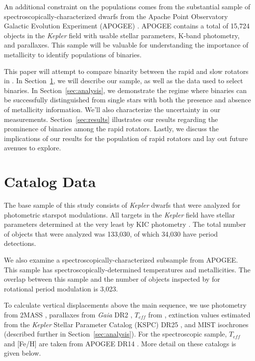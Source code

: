 \documentclass[manuscript]{aastex6}
\newcommand{\Kepler}{\mbox{\textit{Kepler}}}
\newcommand{\Gaia}{\mbox{\textit{Gaia}}}
\newcommand{\Teff}{\ensuremath{T_{eff}}}
\begin{document}
An additional constraint on the populations comes from the substantial sample
of spectroscopically-characterized dwarfs from the Apache Point Observatory
Galactic Evolution Experiment (APOGEE) \citep{Majewski17}. APOGEE contains a 
total of 15,724 objects in the \Kepler{} field with usable stellar parameters,
K-band photometry, and parallaxes.  This sample will be valuable for 
understanding the importance of metallicity to identify populations of 
binaries.

This paper will attempt to compare binarity between the rapid and slow rotators 
in \citet{McQuillan14}. In Section~\ref{sec:data}, we will describe our 
sample, as well as the data used to select binaries. In Section~\ref{sec:analysis}, we demonstrate the regime where 
binaries can be successfully distinguished from single stars with both the 
presence and absence of metallicity information. We'll also characterize the 
uncertainty in our measurements. Section~\ref{sec:results} illustrates our 
results regarding the prominence of binaries among the rapid rotators. Lastly, 
we discuss the implications of our results for the population of rapid rotators 
and lay out future avenues to explore.

\section{Catalog Data}
\label{sec:data}

The base sample of this study consists of \Kepler{} dwarfs that were analyzed
for photometric starspot modulations. All targets in the \Kepler{} field have 
stellar parameters determined at the very least by KIC photometry 
\citep{Brown11}. The total number of objects that were analyzed was 133,030, 
of which 34,030 have period detections.

We also examine a spectroscopically-characterized subsample from APOGEE\@. 
This sample has spectroscopically-determined temperatures and metallicities. 
The overlap between this sample and the number of objects inspected by 
\citet{McQuillan14} for rotational period modulation is 3,023.

To calculate vertical displacements above the main sequence, we use photometry
from 2MASS \citep{Skrutskie06}, parallaxes from \Gaia{} DR2 \citep{Gaia18},
\Teff{} from \citet{Pinsonneault12}, extinction values estimated from the 
\Kepler{} Stellar Parameter Catalog (KSPC) DR25 \citep{Huber14,Mathur17}, and
MIST isochrones \citep{Choi16} (described further in
Section~\ref{sec:analysis}). For the spectroscopic sample, \Teff{} and [Fe/H] 
are taken from APOGEE DR14 \citep{Abolfathi18}. More detail on these catalogs 
is given below.
\end{document}
